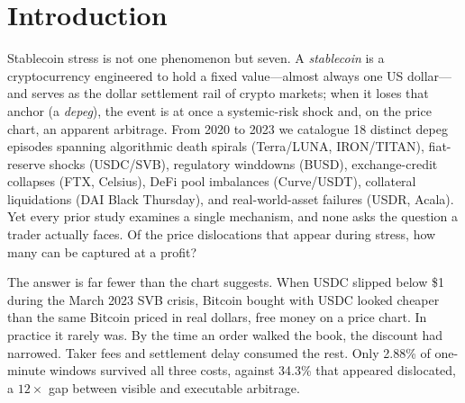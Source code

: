 \documentclass[sigconf,anonymous,natbib=false]{acmart}
\begin{document}

\maketitle

\section{Introduction}
\label{sec:intro}

Stablecoin stress is not one phenomenon but seven.
A \emph{stablecoin} is a cryptocurrency engineered to hold a fixed value---almost
always one US dollar---and serves as the dollar settlement rail of crypto markets;
when it loses that anchor (a \emph{depeg}), the event is at once a systemic-risk
shock and, on the price chart, an apparent arbitrage.
From 2020 to 2023 we catalogue 18 distinct depeg episodes spanning
algorithmic death spirals (Terra/LUNA, IRON/TITAN), fiat-reserve shocks
(USDC/SVB), regulatory winddowns (BUSD), exchange-credit collapses
(FTX, Celsius), DeFi pool imbalances (Curve/USDT), collateral
liquidations (DAI Black Thursday), and real-world-asset failures
(USDR, Acala).
Yet every prior study examines a single mechanism, and none asks the
question a trader actually faces. Of the price dislocations that appear
during stress, how many can be captured at a profit?

The answer is far fewer than the chart suggests.
When USDC slipped below \$1 during the March 2023 SVB crisis, Bitcoin
bought with USDC looked cheaper than the same Bitcoin priced in real
dollars, free money on a price chart.
In practice it rarely was.
By the time an order walked the book, the discount had narrowed. Taker
fees and settlement delay consumed the rest.
Only 2.88\% of one-minute windows survived all three costs, against
34.3\% that appeared dislocated, a $12\times$ gap between visible and
executable arbitrage.
\end{document}
